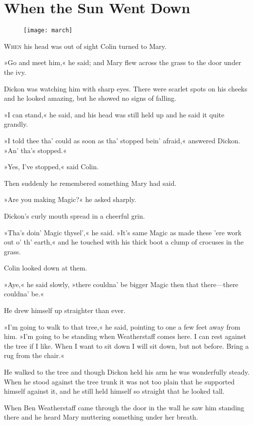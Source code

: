 \chapter{When the Sun Went Down} 
	
\begin{figure}[t!]
\centering
\texttt{[image: march]}
\end{figure}

	\lettrine[lines=6]{W}{hen} his head was out of sight Colin turned to Mary.

\zz
»Go and meet him,« he said; and Mary flew across the grass to the door under the ivy.

\zz
Dickon was watching him with sharp eyes. There were scarlet spots on his cheeks and he looked amazing, but he showed no signs of falling.

»I can stand,« he said, and his head was still held up and he said it quite grandly.

»I told thee tha' could as soon as tha' stopped bein' afraid,« answered Dickon. »An' tha's stopped.«

»Yes, I've stopped,« said Colin.

Then suddenly he remembered something Mary had said.

»Are you making Magic?« he asked sharply.

Dickon's curly mouth spread in a cheerful grin.

»Tha's doin' Magic thysel',« he said. »It's same Magic as made these 'ere work out o' th' earth,« and he touched with his thick boot a clump of crocuses in the grass.

Colin looked down at them.

»Aye,« he said slowly, »there couldna' be bigger Magic then that there—there couldna' be.«

He drew himself up straighter than ever.

»I'm going to walk to that tree,« he said, pointing to one a few feet away from him. »I'm going to be standing when Weatherstaff comes here. I can rest against the tree if I like. When I want to sit down I will sit down, but not before. Bring a rug from the chair.«

He walked to the tree and though Dickon held his arm he was wonderfully steady. When he stood against the tree trunk it was not too plain that he supported himself against it, and he still held himself so straight that he looked tall.

When Ben Weatherstaff came through the door in the wall he saw him standing there and he heard Mary muttering something under her breath.

